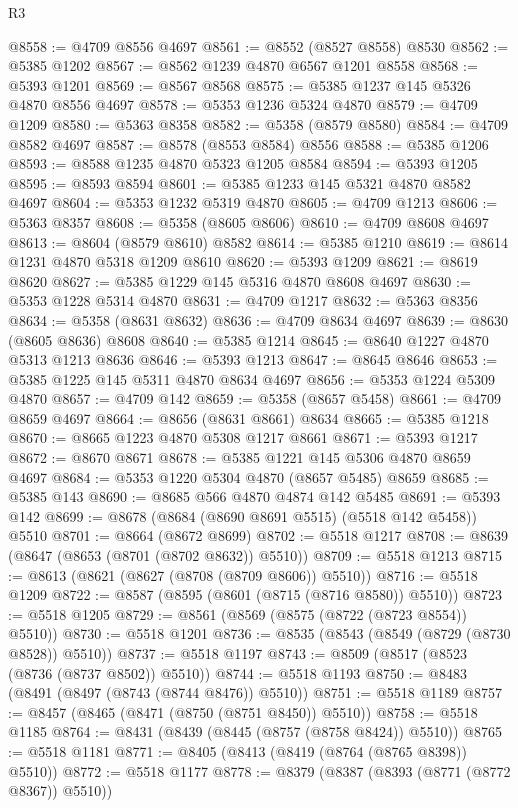 \begin{lexlean}{R3}
\begin{coremodule}
@8558 := @4709 @8556 @4697
@8561 := @8552 (@8527 @8558) @8530
@8562 := @5385 @1202
@8567 := @8562 @1239 @4870 @6567 @1201 @8558
@8568 := @5393 @1201
@8569 := @8567 @8568
@8575 := @5385 @1237 @145 @5326 @4870 @8556 @4697
@8578 := @5353 @1236 @5324 @4870
@8579 := @4709 @1209
@8580 := @5363 @8358
@8582 := @5358 (@8579 @8580)
@8584 := @4709 @8582 @4697
@8587 := @8578 (@8553 @8584) @8556
@8588 := @5385 @1206
@8593 := @8588 @1235 @4870 @5323 @1205 @8584
@8594 := @5393 @1205
@8595 := @8593 @8594
@8601 := @5385 @1233 @145 @5321 @4870 @8582 @4697
@8604 := @5353 @1232 @5319 @4870
@8605 := @4709 @1213
@8606 := @5363 @8357
@8608 := @5358 (@8605 @8606)
@8610 := @4709 @8608 @4697
@8613 := @8604 (@8579 @8610) @8582
@8614 := @5385 @1210
@8619 := @8614 @1231 @4870 @5318 @1209 @8610
@8620 := @5393 @1209
@8621 := @8619 @8620
@8627 := @5385 @1229 @145 @5316 @4870 @8608 @4697
@8630 := @5353 @1228 @5314 @4870
@8631 := @4709 @1217
@8632 := @5363 @8356
@8634 := @5358 (@8631 @8632)
@8636 := @4709 @8634 @4697
@8639 := @8630 (@8605 @8636) @8608
@8640 := @5385 @1214
@8645 := @8640 @1227 @4870 @5313 @1213 @8636
@8646 := @5393 @1213
@8647 := @8645 @8646
@8653 := @5385 @1225 @145 @5311 @4870 @8634 @4697
@8656 := @5353 @1224 @5309 @4870
@8657 := @4709 @142
@8659 := @5358 (@8657 @5458)
@8661 := @4709 @8659 @4697
@8664 := @8656 (@8631 @8661) @8634
@8665 := @5385 @1218
@8670 := @8665 @1223 @4870 @5308 @1217 @8661
@8671 := @5393 @1217
@8672 := @8670 @8671
@8678 := @5385 @1221 @145 @5306 @4870 @8659 @4697
@8684 := @5353 @1220 @5304 @4870 (@8657 @5485) @8659
@8685 := @5385 @143
@8690 := @8685 @566 @4870 @4874 @142 @5485
@8691 := @5393 @142
@8699 := @8678 (@8684 (@8690 @8691 @5515) (@5518 @142 @5458)) @5510
@8701 := @8664 (@8672 @8699)
@8702 := @5518 @1217
@8708 := @8639 (@8647 (@8653 (@8701 (@8702 @8632)) @5510))
@8709 := @5518 @1213
@8715 := @8613 (@8621 (@8627 (@8708 (@8709 @8606)) @5510))
@8716 := @5518 @1209
@8722 := @8587 (@8595 (@8601 (@8715 (@8716 @8580)) @5510))
@8723 := @5518 @1205
@8729 := @8561 (@8569 (@8575 (@8722 (@8723 @8554)) @5510))
@8730 := @5518 @1201
@8736 := @8535 (@8543 (@8549 (@8729 (@8730 @8528)) @5510))
@8737 := @5518 @1197
@8743 := @8509 (@8517 (@8523 (@8736 (@8737 @8502)) @5510))
@8744 := @5518 @1193
@8750 := @8483 (@8491 (@8497 (@8743 (@8744 @8476)) @5510))
@8751 := @5518 @1189
@8757 := @8457 (@8465 (@8471 (@8750 (@8751 @8450)) @5510))
@8758 := @5518 @1185
@8764 := @8431 (@8439 (@8445 (@8757 (@8758 @8424)) @5510))
@8765 := @5518 @1181
@8771 := @8405 (@8413 (@8419 (@8764 (@8765 @8398)) @5510))
@8772 := @5518 @1177
@8778 := @8379 (@8387 (@8393 (@8771 (@8772 @8367)) @5510))

\end{coremodule}
\end{lexlean}
